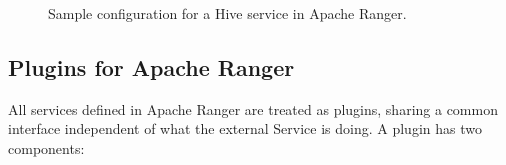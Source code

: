 \begin{figure}
    \centering
    \qquad
    \caption{Sample configuration for a Hive service in Apache Ranger.}
    \label{fig:ranger_hive_details}
\end{figure}

\subsection{\label{sec:plugins_for_apache_ranger} Plugins for Apache Ranger}

All services defined in Apache Ranger are treated as plugins, sharing a common interface independent of what the external Service is doing. A plugin has two components:

